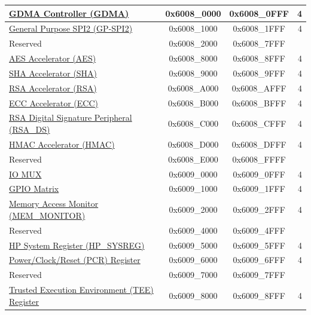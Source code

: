 \begin{ThreePartTable}
\begin{longtable}[c]{ |p{7cm}|c|c|r| }
\hyperref[mod:dma]{GDMA Controller (GDMA)}& 0x6008\_0000 & 0x6008\_0FFF &   4     \\\hline
\hyperref[mod:spi]{General Purpose SPI2 (GP-SPI2)}& 0x6008\_1000 & 0x6008\_1FFF &   4     \\\hline
    \rowcolor{gray!25}  Reserved                    & 0x6008\_2000 & 0x6008\_7FFF &         \\\hline
\hyperref[mod:aes]{AES Accelerator (AES)}& 0x6008\_8000 & 0x6008\_8FFF &   4     \\\hline
\hyperref[mod:sha]{SHA Accelerator (SHA)} & 0x6008\_9000 & 0x6008\_9FFF &   4     \\\hline
\hyperref[mod:rsa]{RSA Accelerator (RSA)}& 0x6008\_A000 & 0x6008\_AFFF &   4     \\\hline
\hyperref[mod:ecc]{ECC Accelerator (ECC)} & 0x6008\_B000 & 0x6008\_BFFF &   4     \\\hline
\hyperref[mod:digsig]{RSA Digital Signature Peripheral (RSA\_DS)} & 0x6008\_C000 & 0x6008\_CFFF &   4     \\\hline
\hyperref[mod:hmac]{HMAC Accelerator (HMAC)}& 0x6008\_D000 & 0x6008\_DFFF &   4     \\\hline
    \rowcolor{gray!25}  Reserved                    & 0x6008\_E000 & 0x6008\_FFFF &         \\\hline
\hyperref[mod:iomuxgpio]{IO MUX}                      & 0x6009\_0000 & 0x6009\_0FFF &   4     \\\hline
\hyperref[mod:iomuxgpio]{GPIO Matrix}& 0x6009\_1000 & 0x6009\_1FFF &   4     \\\hline
\hyperref[mod:dbgassist]{Memory Access Monitor (MEM\_MONITOR)}\tnote{\textcolor{red}{*}}                & 0x6009\_2000 & 0x6009\_2FFF &   4   \\\hline
    \rowcolor{gray!25}  Reserved                    & 0x6009\_4000 & 0x6009\_4FFF &         \\\hline
\hyperref[mod:sysreg]{HP System Register (HP\_SYSREG)}
& 0x6009\_5000 & 0x6009\_5FFF &   4     \\\hline
\hyperref[mod:resclk]{Power/Clock/Reset (PCR) Register}                     & 0x6009\_6000 & 0x6009\_6FFF &   4     \\\hline %
    \rowcolor{gray!25}  Reserved                    & 0x6009\_7000 & 0x6009\_7FFF &         \\\hline
\hyperref[mod:permctrl]{Trusted Execution Environment (TEE) Register}\tnote{\textcolor{red}{*}}                     & 0x6009\_8000 & 0x6009\_8FFF &   4 \\\hline

\end{longtable}
\end{ThreePartTable}
